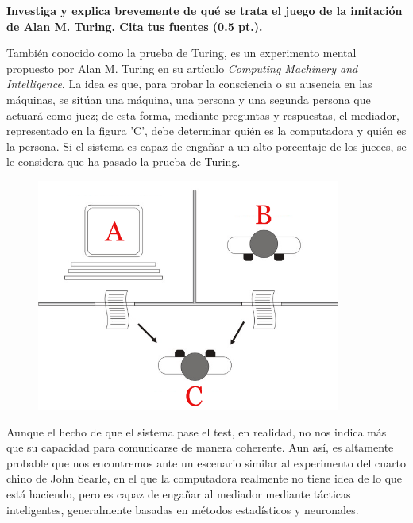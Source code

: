\textbf{Investiga y explica brevemente de qué se trata el juego de la imitación de Alan M. Turing. Cita tus fuentes (0.5 pt.).}

También conocido como la prueba de Turing, es un experimento mental propuesto por Alan M. Turing en su artículo \textit{Computing Machinery and Intelligence}. La idea es que, para probar la consciencia o su ausencia en las máquinas, se sitúan una máquina, una persona y una segunda persona que actuará como juez; de esta forma, mediante preguntas y respuestas, el mediador, representado en la figura 'C', debe determinar quién es la computadora y quién es la persona. Si el sistema es capaz de engañar a un alto porcentaje de los jueces, se le considera que ha pasado la prueba de Turing. \vspace{.3cm}

\cite{turing1950computing}

\begin{figure}[h]
    \includegraphics[width=10cm]{src/Img/Turing_test_diagram.png}
    \centering
    \caption{\cite{testTuring}}
\end{figure}

Aunque el hecho de que el sistema pase el test, en realidad, no nos indica más que su capacidad para comunicarse de manera coherente. Aun así, es altamente probable que nos encontremos ante un escenario similar al experimento del cuarto chino de John Searle, en el que la computadora realmente no tiene idea de lo que está haciendo, pero es capaz de engañar al mediador mediante tácticas inteligentes, generalmente basadas en métodos estadísticos y neuronales. \vspace{.3cm}
